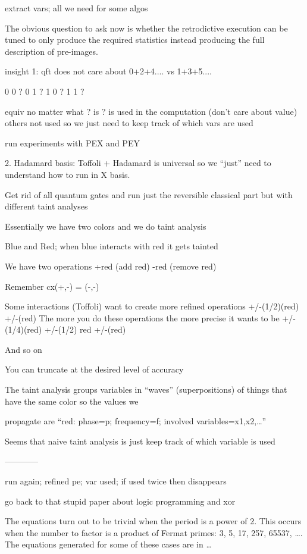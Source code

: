 \documentclass{article}
\begin{document}
extract vars; all we need for some algos

The obvious question to ask now is whether the retrodictive execution
can be tuned to only produce the required statistics instead producing
the full description of pre-images. 

insight 1: qft does not care about 0+2+4.... vs 1+3+5....

0 0 ?
0 1 ?
1 0 ?
1 1 ?

equiv no matter what ? is
? is used in the computation (don't care about value)
others not used
so we just need to keep track of which vars are used

run experiments with PEX and PEY





2. Hadamard basis: Toffoli + Hadamard is universal so we “just” need to understand how to run in X basis. 

   Get rid of all quantum gates and run just the reversible classical part but with different taint analyses

   Essentially we have two colors and we do taint analysis

   Blue and Red; when blue interacts with red it gets tainted

   We have two operations +red (add red) -red (remove red)

   Remember cx(+,-) = (-,-) 

   Some interactions (Toffoli) want to create more refined operations +/-(1/2)(red) +/-(red)
   The more you do these operations the more precise it wants to be +/-(1/4)(red) +/-(1/2) red +/-(red)

   And so on

   You can truncate at the desired level of accuracy

   The taint analysis groups variables in “waves” (superpositions) of things that have the same color so the values we

     propagate are “red: phase=p; frequency=f; involved variables={x1,x2,…}”

   Seems that naive taint analysis is just keep track of which variable is used

------------

run again; refined pe; var used; if used twice then disappears

go back to that stupid paper about logic programming and xor 

The equations turn out to be trivial when the period is a power of
2. This occurs when the number to factor is a product of Fermat
primes: 3, 5, 17, 257, 65537, \ldots. The equations generated for some
of these cases are in \ldots
\end{document}
